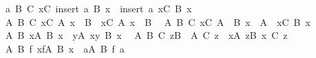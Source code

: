 \begin{isabellebody}
\ \ {\isachardoublequoteopen}{\isasymAnd}a\ B\ C{\isachardot}{\kern0pt}\ {\isacharparenleft}{\kern0pt}{\isasymInter}x{\isasymin}C{\isachardot}{\kern0pt}\ insert\ a\ {\isacharparenleft}{\kern0pt}B\ x{\isacharparenright}{\kern0pt}{\isacharparenright}{\kern0pt}\ {\isacharequal}{\kern0pt}\ insert\ a\ {\isacharparenleft}{\kern0pt}{\isasymInter}x{\isasymin}C{\isachardot}{\kern0pt}\ B\ x{\isacharparenright}{\kern0pt}{\isachardoublequoteclose}\isanewline
\ \ {\isachardoublequoteopen}{\isasymAnd}A\ B\ C{\isachardot}{\kern0pt}\ {\isacharparenleft}{\kern0pt}{\isasymInter}x{\isasymin}C{\isachardot}{\kern0pt}\ A\ x\ {\isasymunion}\ B{\isacharparenright}{\kern0pt}\ {\isacharequal}{\kern0pt}\ {\isacharparenleft}{\kern0pt}{\isacharparenleft}{\kern0pt}{\isasymInter}x{\isasymin}C{\isachardot}{\kern0pt}\ A\ x{\isacharparenright}{\kern0pt}\ {\isasymunion}\ B{\isacharparenright}{\kern0pt}{\isachardoublequoteclose}\isanewline
\ \ {\isachardoublequoteopen}{\isasymAnd}A\ B\ C{\isachardot}{\kern0pt}\ {\isacharparenleft}{\kern0pt}{\isasymInter}x{\isasymin}C{\isachardot}{\kern0pt}\ A\ {\isasymunion}\ B\ x{\isacharparenright}{\kern0pt}\ {\isacharequal}{\kern0pt}\ {\isacharparenleft}{\kern0pt}A\ {\isasymunion}\ {\isacharparenleft}{\kern0pt}{\isasymInter}x{\isasymin}C{\isachardot}{\kern0pt}\ B\ x{\isacharparenright}{\kern0pt}{\isacharparenright}{\kern0pt}{\isachardoublequoteclose}\isanewline
\ \ {\isachardoublequoteopen}{\isasymAnd}A\ B{\isachardot}{\kern0pt}\ {\isacharparenleft}{\kern0pt}{\isasymInter}x{\isasymin}{\isasymUnion}A{\isachardot}{\kern0pt}\ B\ x{\isacharparenright}{\kern0pt}\ {\isacharequal}{\kern0pt}\ {\isacharparenleft}{\kern0pt}{\isasymInter}y{\isasymin}A{\isachardot}{\kern0pt}\ {\isasymInter}x{\isasymin}y{\isachardot}{\kern0pt}\ B\ x{\isacharparenright}{\kern0pt}{\isachardoublequoteclose}\isanewline
\ \ {\isachardoublequoteopen}{\isasymAnd}A\ B\ C{\isachardot}{\kern0pt}\ {\isacharparenleft}{\kern0pt}{\isasymInter}z{\isasymin}{\isacharparenleft}{\kern0pt}{\isasymUnion}{\isacharparenleft}{\kern0pt}B\ {\isacharbackquote}{\kern0pt}\ A{\isacharparenright}{\kern0pt}{\isacharparenright}{\kern0pt}{\isachardot}{\kern0pt}\ C\ z{\isacharparenright}{\kern0pt}\ {\isacharequal}{\kern0pt}\ {\isacharparenleft}{\kern0pt}{\isasymInter}x{\isasymin}A{\isachardot}{\kern0pt}\ {\isasymInter}z{\isasymin}B\ x{\isachardot}{\kern0pt}\ C\ z{\isacharparenright}{\kern0pt}{\isachardoublequoteclose}\isanewline
\ \ {\isachardoublequoteopen}{\isasymAnd}A\ B\ f{\isachardot}{\kern0pt}\ {\isacharparenleft}{\kern0pt}{\isasymInter}x{\isasymin}f{\isacharbackquote}{\kern0pt}A{\isachardot}{\kern0pt}\ B\ x{\isacharparenright}{\kern0pt}\ {\isacharequal}{\kern0pt}\ {\isacharparenleft}{\kern0pt}{\isasymInter}a{\isasymin}A{\isachardot}{\kern0pt}\ B\ {\isacharparenleft}{\kern0pt}f\ a{\isacharparenright}{\kern0pt}{\isacharparenright}{\kern0pt}{\isachardoublequoteclose}\isanewline

\end{isabellebody}
